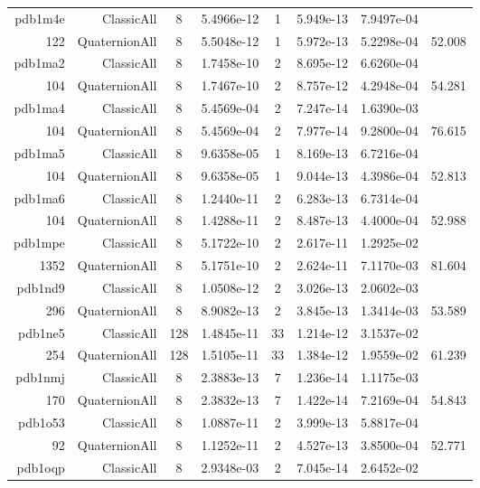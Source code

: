\begin{xltabular}{\textwidth}{r|rcS[table-format=1.4e+2]cS[table-format=1.3e+2]S[table-format=1.4e+2]S[table-format=-1.3]}
pdb1m4e & ClassicAll & 8 & 5.4966e-12 & 1 & 5.949e-13 & 7.9497e-04 & \\
122 & QuaternionAll & 8 & 5.5048e-12 & 1 & 5.972e-13 & 5.2298e-04 & 52.008\\  \addlinespace
pdb1ma2 & ClassicAll & 8 & 1.7458e-10 & 2 & 8.695e-12 & 6.6260e-04 & \\
104 & QuaternionAll & 8 & 1.7467e-10 & 2 & 8.757e-12 & 4.2948e-04 & 54.281\\  \addlinespace
pdb1ma4 & ClassicAll & 8 & 5.4569e-04 & 2 & 7.247e-14 & 1.6390e-03 & \\
104 & QuaternionAll & 8 & 5.4569e-04 & 2 & 7.977e-14 & 9.2800e-04 & 76.615\\  \addlinespace
pdb1ma5 & ClassicAll & 8 & 9.6358e-05 & 1 & 8.169e-13 & 6.7216e-04 & \\
104 & QuaternionAll & 8 & 9.6358e-05 & 1 & 9.044e-13 & 4.3986e-04 & 52.813\\  \addlinespace
pdb1ma6 & ClassicAll & 8 & 1.2440e-11 & 2 & 6.283e-13 & 6.7314e-04 & \\
104 & QuaternionAll & 8 & 1.4288e-11 & 2 & 8.487e-13 & 4.4000e-04 & 52.988\\  \addlinespace
pdb1mpe & ClassicAll & 8 & 5.1722e-10 & 2 & 2.617e-11 & 1.2925e-02 & \\
1352 & QuaternionAll & 8 & 5.1751e-10 & 2 & 2.624e-11 & 7.1170e-03 & 81.604\\  \addlinespace
pdb1nd9 & ClassicAll & 8 & 1.0508e-12 & 2 & 3.026e-13 & 2.0602e-03 & \\
296 & QuaternionAll & 8 & 8.9082e-13 & 2 & 3.845e-13 & 1.3414e-03 & 53.589\\  \addlinespace
pdb1ne5 & ClassicAll & 128 & 1.4845e-11 & 33 & 1.214e-12 & 3.1537e-02 & \\
254 & QuaternionAll & 128 & 1.5105e-11 & 33 & 1.384e-12 & 1.9559e-02 & 61.239\\  \addlinespace
pdb1nmj & ClassicAll & 8 & 2.3883e-13 & 7 & 1.236e-14 & 1.1175e-03 & \\
170 & QuaternionAll & 8 & 2.3832e-13 & 7 & 1.422e-14 & 7.2169e-04 & 54.843\\  \addlinespace
pdb1o53 & ClassicAll & 8 & 1.0887e-11 & 2 & 3.999e-13 & 5.8817e-04 & \\
92 & QuaternionAll & 8 & 1.1252e-11 & 2 & 4.527e-13 & 3.8500e-04 & 52.771\\  \addlinespace
pdb1oqp & ClassicAll & 8 & 2.9348e-03 & 2 & 7.045e-14 & 2.6452e-02 & \\

\end{xltabular}
